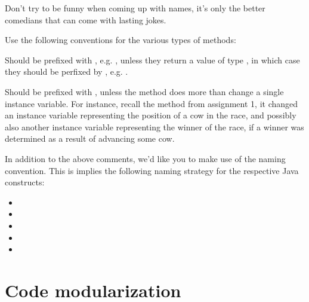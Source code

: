Don't try to be funny when coming up with names, it's only the better comedians
that can come with lasting jokes.

Use the following conventions for the various types of methods:

\begin{description}[\setleftmargin{80pt}\setlabelstyle{\itshape}]

\item [Accessor methods] Should be prefixed with , e.g.
, unless they return a value of type , in which
case they should be perfixed by , e.g. .

\item [Mutator methods] Should be prefixed with , unless the method
does more than change a single instance variable. For instance, recall the
method  from assignment 1, it changed an instance variable
representing the position of a cow in the race, and possibly also another
instance variable representing the winner of the race, if a winner was
determined as a result of advancing some cow.

\end{description}

In addition to the above comments, we'd like you to make use of the
 naming convention. This is implies the following naming
strategy for the respective Java constructs:

\begin{itemize}

\item {}

\item {}

\item {}

\item {}

\item {}

\end{itemize}

\section{Code modularization}

